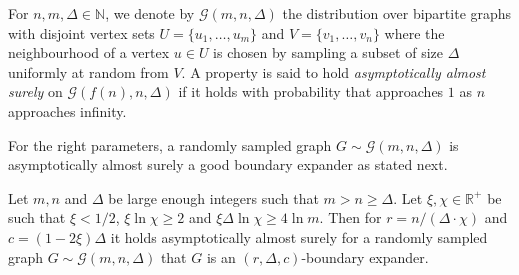 \documentclass{article}
\newcommand{\Rplus}     {\mathbb{R}^{+}}
\newcommand{\N}         {\mathbb{N}}
\newcommand{\set}[1]{\{ #1 \}}
\newcommand{\aas}{asymptotically almost surely\xspace}
\newcommand{\numpigeons}{m}
\newcommand{\numholes}{n}
\newcommand{\diff}{\xi}
\newcommand{\GdegMax}{\Delta}
\newcommand{\Gdist}{\mathcal{G}}
\numberwithin{equation}{section}
\begin{document}
For $\numholes, \numpigeons, \GdegMax \in \N$, we
denote by $\Gdist(\numpigeons, \numholes, \GdegMax)$ the distribution over
bipartite graphs
with disjoint vertex sets $U = \set{u_1, \ldots, u_{\numpigeons}}$ and 
$V = \set{v_1, \ldots, v_{\numholes}}$
where the neighbourhood of a vertex $u \in U$ is chosen by sampling 
a subset of size $\GdegMax$ uniformly at random from $V$.
A property is said to hold
\emph{\aas} on $\Gdist(f(\numholes), \numholes, \GdegMax)$ if it
holds with probability that approaches $1$ as $\numholes$ approaches infinity.

For the right parameters, a randomly sampled graph
$G \sim \Gdist(\numpigeons, \numholes, \GdegMax)$ is asymptotically
almost surely a good boundary expander as stated next.

\begin{lemma}\label{lem:expander}
  Let $\numpigeons,\numholes$ and $\GdegMax$ be large enough integers such that 
  $\numpigeons > \numholes \ge \GdegMax $.
  Let $\diff, \chi \in \Rplus$
  be such that 
  $\diff < 1/2$,
  $\diff \ln \chi \ge 2$
  and $\diff \GdegMax \ln \chi \ge 4 \ln \numpigeons$.
  Then for
  $r =  \numholes /(\GdegMax \cdot \chi )$ 
  and $c = (1 - 2 \diff) \GdegMax$
  it holds
  asymptotically almost surely for a randomly sampled graph
  $G \sim \Gdist(\numpigeons,\numholes,\GdegMax)$
  that
  $G$ is an 
  $(r, \GdegMax, c)$-boundary expander.
\end{lemma}
\end{document}
